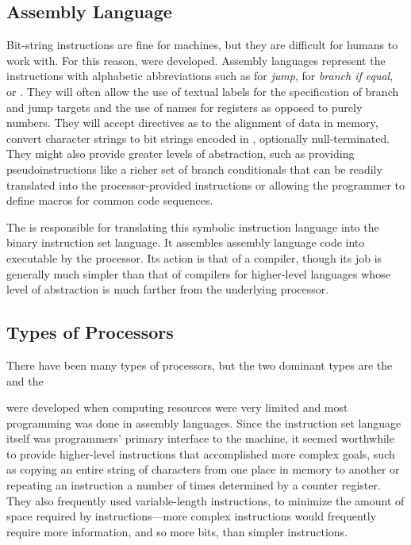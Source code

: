 \subsection{Assembly Language}
Bit-string instructions are fine for machines, but they are difficult for humans to work with. For this reason,  were developed. Assembly languages represent the instructions with alphabetic abbreviations such as  for \emph{jump},  for \emph{branch if equal}, or . They will often allow the use of textual labels for the specification of branch and jump targets and the use of names for registers as opposed to purely numbers. They will accept directives as to the alignment of data in memory, convert character strings to bit strings encoded in , optionally null-terminated. They might also provide greater levels of abstraction, such as providing pseudoinstructions like a richer set of branch conditionals that can be readily translated into the processor-provided instructions or allowing the programmer to define macros for common code sequences.

The  is responsible for translating this symbolic instruction language into the binary instruction set language. It assembles assembly language code into  executable by the processor. Its action is that of a compiler, though its job is generally much simpler than that of compilers for higher-level languages whose level of abstraction is much farther from the underlying processor.

\subsection{Types of Processors}
There have been many types of processors, but the two dominant types are the  and the 

\CISCs were developed when computing resources were very limited and most programming was done in assembly languages. Since the instruction set language itself was programmers' primary interface to the machine, it seemed worthwhile to provide higher-level instructions that accomplished more complex goals, such as copying an entire string of characters from one place in memory to another or repeating an instruction a number of times determined by a counter register. They also frequently used variable-length instructions, to minimize the amount of space required by instructions---more complex instructions would frequently require more information, and so more bits, than simpler instructions.

